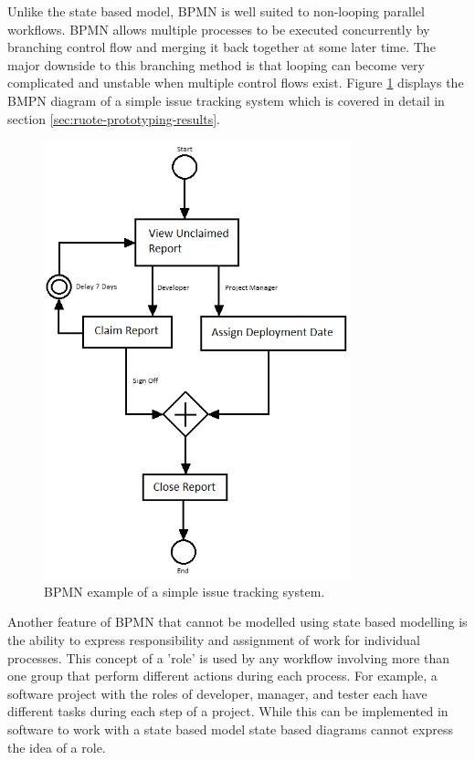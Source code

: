 \documentclass[document.tex]{subfiles}
\begin{document}
\FloatBarrier

Unlike the state based model, BPMN is well suited to non-looping parallel workflows. BPMN allows multiple processes to be executed concurrently by branching  control flow and merging it back together at some later time. The major downside to this branching method is that looping can become very complicated and unstable when multiple control flows exist. Figure \ref{fig:bpmn-example-diagram} displays the BMPN diagram of a simple issue tracking system which is covered in detail in section \ref{sec:ruote-prototyping-results}.

\begin{figure}[!ht]
\centering \includegraphics[height=5in]{./img/prototypes/ruote-bpmn-diagram}
\caption{BPMN example of a simple issue tracking system.}
\label{fig:bpmn-example-diagram}
\end{figure}

\FloatBarrier

Another feature of BPMN that cannot be modelled using state based modelling is the ability to express responsibility and assignment of work for individual processes. This concept of a 'role' is used by any workflow involving more than one group that perform different actions during each process. For example, a software project with the roles of developer, manager, and tester each have different tasks during each step of a project. While this can be implemented in software to work with a state based model state based diagrams cannot express the idea of a role.
\end{document}
